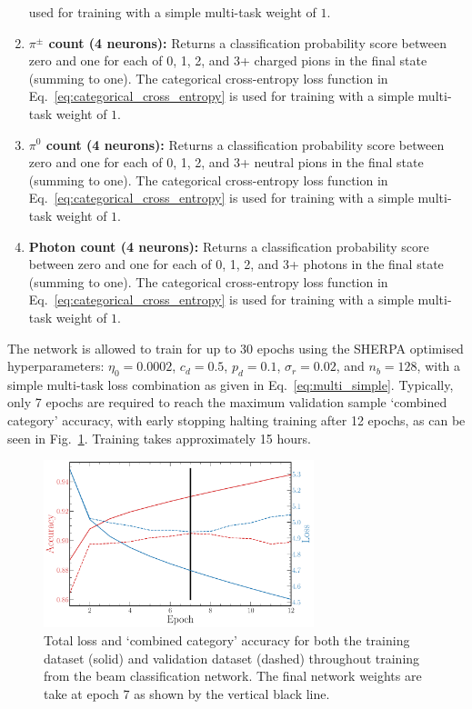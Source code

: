 \begin{enumerate}
          used for training with a simple multi-task weight of $1$.
    \item \textbf{$\pi^{\pm}$ count (4 neurons):} Returns a classification probability score
          between zero and one for each of 0, 1, 2, and 3+ charged pions in the final state
          (summing to one). The categorical cross-entropy loss function in
          Eq.~\ref{eq:categorical_cross_entropy} is used for training with a simple multi-task
          weight of $1$.
    \item \textbf{$\pi^{0}$ count (4 neurons):} Returns a classification probability score between
          zero and one for each of 0, 1, 2, and 3+ neutral pions in the final state (summing to
          one). The categorical cross-entropy loss function in
          Eq.~\ref{eq:categorical_cross_entropy} is used for training with a simple multi-task
          weight of $1$.
    \item \textbf{Photon count (4 neurons):} Returns a classification probability score between
          zero and one for each of 0, 1, 2, and 3+ photons in the final state (summing to one).
          The categorical cross-entropy loss function in Eq.~\ref{eq:categorical_cross_entropy} is
          used for training with a simple multi-task weight of $1$.
\end{enumerate}

The network is allowed to train for up to 30 epochs using the SHERPA optimised hyperparameters:
$\eta_{0}=0.0002$, $c_{d}=0.5$, $p_{d}=0.1$, $\sigma_{r}=0.02$, and $n_{b}=128$, with a simple
multi-task loss combination as given in Eq.~\ref{eq:multi_simple}. Typically, only 7 epochs are
required to reach the maximum validation sample `combined category' accuracy, with early stopping
halting training after 12 epochs, as can be seen in Fig.~\ref{fig:final_beam_history}. Training
takes approximately 15 hours.

\begin{figure} %
    \includegraphics[width=0.7\textwidth]{diagrams/6-cvn/chipsnet/final_beam_history.pdf}
    \caption[Loss and accuracy throughout training for the beam classification network.]
    {Total loss and `combined category' accuracy for both the training dataset (solid) and
        validation dataset (dashed) throughout training from the beam classification network. The
        final network weights are take at epoch 7 as shown by the vertical black line.}
    \label{fig:final_beam_history}
\end{figure}

